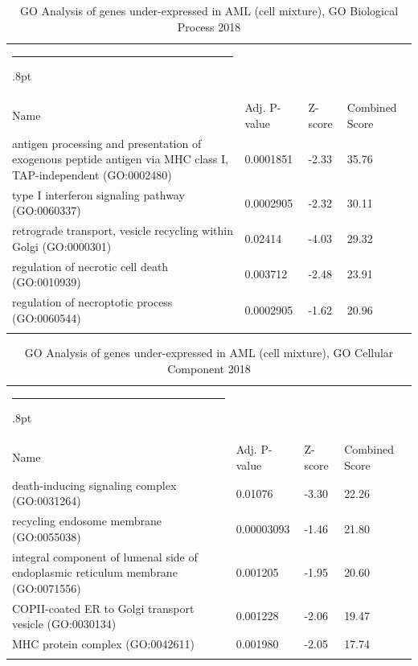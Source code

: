 \documentclass[3p,authoryear,preprint,12pt]{elsarticle}
\makeatletter
\def\hlinewd#1{%
  \noalign{\ifnum0=`}\fi\hrule \@height #1%
  \futurelet\reserved@a\@xhline}
\def\tbltoprule{\hlinewd{.8pt}\\[-12pt]}
\def\tblbottomrule{\noalign{\vspace*{6pt}}\hline\noalign{\vspace*{2pt}}}
\def\tblmidrule{\noalign{\vspace*{6pt}}\hline\noalign{\vspace*{2pt}}}
\makeatother
\begin{document}
\begin{table}[!htbp]
	\caption{{GO Analysis of genes under-expressed in AML (cell mixture), GO Biological Process 2018} }
	\label{tw-de478ae31fc6}
	\def\arraystretch{1}
	\ignorespaces 
	\centering 
	\begin{tabulary}{\linewidth}{p{\dimexpr.65\tabcolsep}p{\dimexpr.15\tabcolsep}p{\dimexpr.1\tabcolsep}p{\dimexpr.1\tabcolsep}}
		\tbltoprule Name & Adj. P-value & Z-score & Combined Score\\
		\tblmidrule
antigen processing and presentation of exogenous peptide antigen via MHC class I, TAP-independent (GO:0002480) & 0.0001851 & -2.33 & 35.76 \\
type I interferon signaling pathway (GO:0060337) & 0.0002905 & -2.32 & 30.11 \\
retrograde transport, vesicle recycling within Golgi (GO:0000301) & 0.02414 & -4.03 & 29.32 \\
regulation of necrotic cell death (GO:0010939) & 0.003712 & -2.48 & 23.91 \\
regulation of necroptotic process (GO:0060544) & 0.0002905 & -1.62 & 20.96 \\
		\tblbottomrule
	\end{tabulary}\par 
\end{table}
\begin{table}[!htbp]
	\caption{{GO Analysis of genes under-expressed in AML (cell mixture), GO Cellular Component 2018} }
	\label{tw-de478ae31gc6}
	\def\arraystretch{1}
	\ignorespaces 
	\centering 
	\begin{tabulary}{\linewidth}{p{\dimexpr.65\tabcolsep}p{\dimexpr.15\tabcolsep}p{\dimexpr.1\tabcolsep}p{\dimexpr.1\tabcolsep}}
		\tbltoprule Name & Adj. P-value & Z-score & Combined Score\\
		\tblmidrule
death-inducing signaling complex (GO:0031264) & 0.01076 & -3.30 & 22.26 \\
recycling endosome membrane (GO:0055038) & 0.00003093 & -1.46 & 21.80 \\
integral component of lumenal side of endoplasmic reticulum membrane (GO:0071556) & 0.001205 & -1.95 & 20.60 \\
COPII-coated ER to Golgi transport vesicle (GO:0030134) & 0.001228 & -2.06 & 19.47 \\
MHC protein complex (GO:0042611) & 0.001980 & -2.05 & 17.74 \\
		\tblbottomrule
	\end{tabulary}\par 
\end{table}
\end{document}
